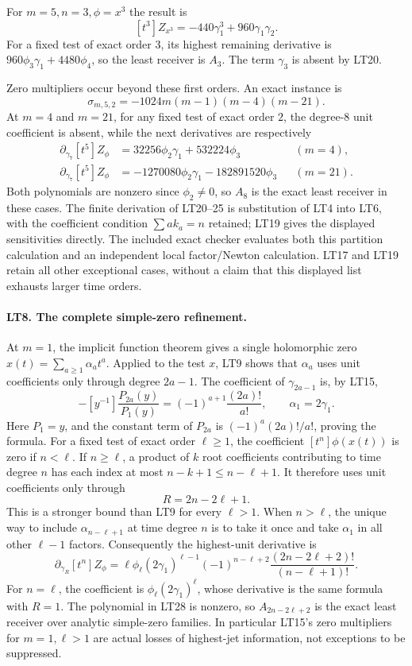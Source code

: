 For $m=5,n=3,\phi=x^3$ the result is
\[
 [t^3]Z_{x^3}=-440\gamma_1^3+960\gamma_1\gamma_2.
 \tag{LT23}
\]
For a fixed test of exact order $3$, its highest remaining
derivative is $960\phi_3\gamma_1+4480\phi_4$, so the least
receiver is $A_3$. The term $\gamma_3$ is absent by LT20.

Zero multipliers occur beyond these first orders. An exact instance is
\[
 \sigma_{m,5,2}=-1024m(m-1)(m-4)(m-21).
 \tag{LT24}
\]
At $m=4$ and $m=21$, for any fixed test of exact order $2$,
the degree-$8$ unit coefficient is absent, while the next
derivatives are respectively
\[
 \begin{aligned}
 \partial_{\gamma_7}[t^5]Z_\phi
       &=32256\phi_2\gamma_1+532224\phi_3 &&(m=4),\\
 \partial_{\gamma_7}[t^5]Z_\phi
       &=-1270080\phi_2\gamma_1-182891520\phi_3 &&(m=21).
 \end{aligned}
 \tag{LT25}
\]
Both polynomials are nonzero since $\phi_2\ne0$, so $A_8$ is
the exact least receiver in these cases.
The finite derivation of LT20--25 is substitution of LT4 into
LT6, with the coefficient condition $\sum a k_a=n$ retained;
LT19 gives the displayed sensitivities directly. The included
exact checker evaluates both this partition calculation and an
independent local factor/Newton calculation. LT17 and LT19
retain all other exceptional cases, without a claim that this
displayed list exhausts larger time orders.

\paragraph{LT8. The complete simple-zero refinement.}
At $m=1$, the implicit function theorem gives a single
holomorphic zero $x(t)=\sum_{a\ge1}\alpha_at^a$.
Applied to the test $x$, LT9 shows that $\alpha_a$ uses
unit coefficients only through degree $2a-1$.
The coefficient of $\gamma_{2a-1}$ is, by LT15,
\[
 -[y^{-1}]\frac{P_{2a}(y)}{P_1(y)}
     =(-1)^{a+1}\frac{(2a)!}{a!},
 \qquad \alpha_1=2\gamma_1.
 \tag{LT26}
\]
Here $P_1=y$, and the constant term of $P_{2a}$ is
$(-1)^a(2a)!/a!$, proving the formula.
For a fixed test of exact order $\ell\ge1$, the coefficient
$[t^n]\phi(x(t))$ is zero if $n<\ell$. If $n\ge\ell$, a product
of $k$ root coefficients contributing to time degree $n$ has
each index at most $n-k+1\le n-\ell+1$. It therefore uses
unit coefficients only through
\[
 R=2n-2\ell+1.
 \tag{LT27}
\]
This is a stronger bound than LT9 for every $\ell>1$.
When $n>\ell$, the unique way to include
$\alpha_{n-\ell+1}$ at time degree $n$ is to take it once
and take $\alpha_1$ in all other $\ell-1$ factors.
Consequently the highest-unit derivative is
\[
 \partial_{\gamma_R}[t^n]Z_\phi
   =\ell\phi_\ell(2\gamma_1)^{\ell-1}
       (-1)^{n-\ell+2}
          \frac{(2n-2\ell+2)!}{(n-\ell+1)!}.
 \tag{LT28}
\]
For $n=\ell$, the coefficient is
$\phi_\ell(2\gamma_1)^\ell$, whose derivative is the same
formula with $R=1$. The polynomial in LT28 is nonzero, so
$A_{2n-2\ell+2}$ is the exact least receiver over analytic
simple-zero families. In particular LT15's zero multipliers
for $m=1,\ell>1$ are actual losses of highest-jet information,
not exceptions to be suppressed.

